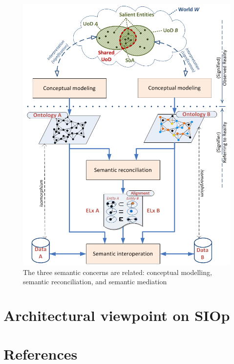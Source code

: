 \documentclass[a4paper,11pt,oneside,oldfontcommands]{memoir}
\theoremstyle{definition}
\theoremstyle{break}		%
\numberwithin{equation}{chapter}
\numberwithin{figure}{chapter}
\begin{document}
\begin{figure}
\hypertarget{fig:3Concerns}{%
\centering
\includegraphics{src/images/3SemanticConcerns.png}
\caption{The three semantic concerns are related: conceptual modelling,
semantic reconciliation, and semantic mediation}\label{fig:3Concerns}
}
\end{figure}

\hypertarget{architectural-viewpoint-on-siop}{%
\chapter{Architectural viewpoint on
SIOp}\label{architectural-viewpoint-on-siop}}

\hypertarget{references}{%
\chapter*{References}\label{references}}

\setlength{\parindent}{-0.2in}
\end{document}
